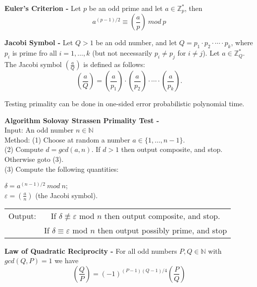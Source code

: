 \documentclass[a4paper]{article}
\begin{document}
\begin{theorem}
\textbf{Euler's Criterion -} Let $p$ be an odd prime and let $a \in \mathbb{Z}_{p}^{*}$, then
$$a^{(p - 1) / 2} \equiv \left( \frac{a}{p} \right)\ mod\ p$$
\end{theorem}


\begin{definition}
\textbf{Jacobi Symbol -} Let $Q > 1$ be an odd number, and let $Q = p_{1} \cdot p_{2} \cdot \cdots \cdot p_{k}$, where $p_{i}$ is prime fro all $i = 1, \ldots, k$ (but not necessarily $p_{i} \neq p_{j}$ for $i \neq j$). Let $a \in \mathbb{Z}_{Q}^{*}$. The Jacobi symbol $\left( \frac{a}{Q} \right)$ is defined as follows:
$$\left( \frac{a}{Q} \right) = \left( \frac{a}{p_{1}} \right) \cdot \left( \frac{a}{p_{2}} \right) \cdot \cdots \cdot \left( \frac{a}{p_{k}} \right).$$
\end{definition}


\begin{theorem}
Testing primality can be done in one-sided error probabilistic polynomial time.
\end{theorem}


\begin{algorithm}
\textbf{Algorithm Solovay Strassen Primality Test -} \\
Input: An odd number $n \in \mathbb{N}$ \\
Method: (1) Choose at random a number $a \in \{1, \ldots, n - 1 \}$. \\
(2) Compute $d = gcd(a, n)$. If $d > 1$ then output composite, and stop. Otherwise goto (3). \\
(3) Compute the following quantities:
\begin{center}
$\delta = a^{(n - 1)/2}\ mod\ n$; \\
$\varepsilon = \left( \frac{a}{n} \right)$ (the Jacobi symbol).
\end{center}
\begin{tabular}{c c}
Output: & If $\delta \not \equiv \varepsilon$ mod $n$ then output composite, and stop. \\
& If $\delta \equiv \varepsilon$ mod $n$ then output possibly prime, and stop
\end{tabular}
\end{algorithm}


\begin{theorem}
\textbf{Law of Quadratic Reciprocity -} For all odd numbers $P, Q \in \mathbb{N}$ with $gcd(Q, P) = 1$ we have
$$\left( \frac{Q}{P} \right) = (-1)^{(P - 1)(Q - 1)/4} \left( \frac{P}{Q} \right)$$
\end{theorem}
\end{document}
